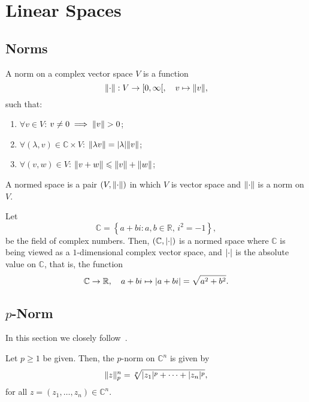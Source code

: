 \section{Linear Spaces}\label{sec:linear-spaces}


\subsection{Norms}\label{subsec:norms}


\begin{definition}\label{def:normed-linear-spaces}
  A norm on a complex vector space \(V\) is a function
  \[
    \norm{\cdot}:V\to\rinterval{0}{\infty},\quad{v\mapsto\norm{v}},
  \]
  such that:
  \begin{enumerate}
    \item
      \(\forall{v\in{V}}\): \(v\neq{0}\implies\lVert v\rVert>0\);
    \item
      \(\forall{(\lambda,v)}\in\mathbb{C}\times{V}\): \(\lVert\lambda{v}\rVert=\lvert\lambda\rvert\lVert v\rVert\);
    \item
      \(\forall{(v,w)}\in{V}\): \(\lVert v+w\rVert\leqslant{\lVert v\rVert+\lVert w\rVert}\);
  \end{enumerate}
  A normed space is a pair \((V,\lVert\cdot\rVert)\) in which \(V\) is vector space and \(\lVert\cdot\rVert\) is a norm on \(V\).
\end{definition}

\begin{example}\label{the-complex-field-is-a-normed-linear-space}
  Let
  \[
    \mathbb{C}=\left\{a+bi:a,b\in\mathbb{R},\,i^{2}=-1\right\},
  \]
  be the field of complex numbers. Then, \((\mathbb{C},\lvert\cdot\rvert)\) is a
  normed space where \(\mathbb{C}\) is being viewed as a \(1\)-dimensional
  complex vector space, and \(\lvert\cdot\rvert\) is the absolute value on
  \(\mathbb{C}\), that is, the function
  \[
    \mathbb{C}\to\mathbb{R},
    \quad{a+bi\mapsto\lvert a+bi\rvert=\sqrt{{a}^{2}+{b}^{2}}}.
  \]
\end{example}


\subsection{\(p\)-Norm}\label{subsec:p-norm}

In this section we closely follow~\cite{yet_another_proof_of_minkowskis_inequality}.

\begin{definition}
  Let \(p\geqslant{1}\) be given. Then, the \(p\)-norm on \(\mathbb{C}^{n}\)
  is given by
  \[
    \lVert z\rVert^{n}_{p}
    =
    \sqrt[p]{\lvert z_{1}\rvert^{p}+\cdots+\lvert z_{n}\rvert^{p}},
  \]
  for all \(z=(z_{1},\ldots,z_{n})\in\mathbb{C}^{n}\).
\end{definition}

